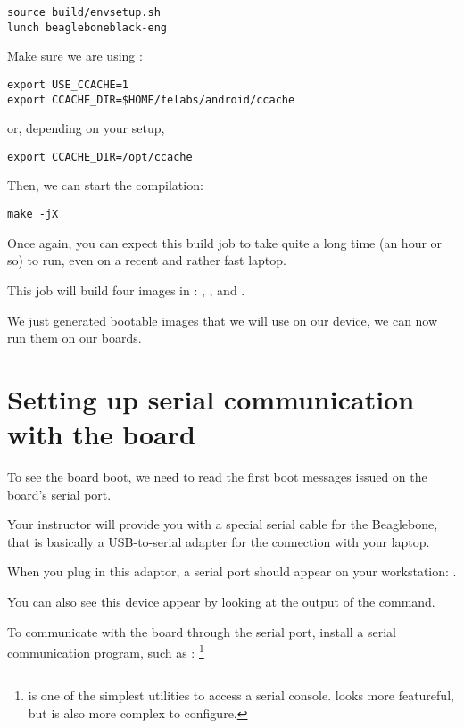 \begin{verbatim}
source build/envsetup.sh
lunch beagleboneblack-eng
\end{verbatim}

Make sure we are using :

\begin{verbatim}
export USE_CCACHE=1
export CCACHE_DIR=$HOME/felabs/android/ccache
\end{verbatim}
or, depending on your setup,
\begin{verbatim}
export CCACHE_DIR=/opt/ccache
\end{verbatim}

Then, we can start the compilation:

\begin{verbatim}
make -jX
\end{verbatim}

Once again, you can expect this build job to take quite a long time
(an hour or so) to run, even on a recent and rather fast laptop.

This job will build four images in
: ,
 ,  and
.

We just generated bootable images that we will use on our device, we
can now run them on our boards.

\section{Setting up serial communication with the board}

To see the board boot, we need to read the first boot messages issued
on the board's serial port.

Your instructor will provide you with a special serial cable for the
Beaglebone, that is basically a USB-to-serial adapter for the
connection with your laptop.

When you plug in this adaptor, a serial port should appear on your
workstation: .

You can also see this device appear by looking at the output of the
 command.

To communicate with the board through the serial port, install a
serial communication program, such as :
\footnote{ is one of the simplest utilities to access a
  serial console.  looks more featureful, but is also
  more complex to configure.}

